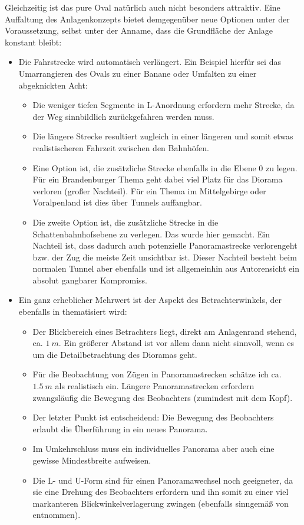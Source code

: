 Gleichzeitig ist das pure Oval nat\"urlich auch nicht besonders attraktiv.
Eine Auffaltung des Anlagenkonzepts bietet demgegen\"uber neue Optionen unter der Voraussetzung, selbst unter der Anname, dass die Grundfl\"ache der Anlage konstant bleibt:
\begin{itemize}
	\item Die Fahrstrecke wird automatisch verl\"angert.
	Ein Beispiel hierf\"ur sei das Umarrangieren des Ovals zu einer Banane oder Umfalten zu einer abgeknickten Acht:
	\begin{itemize}
		\item Die weniger tiefen Segmente in L-Anordnung erfordern mehr Strecke, da der Weg sinnbildlich zur\"uckgefahren werden muss.
		\item Die l\"angere Strecke resultiert zugleich in einer l\"angeren und somit etwas realistischeren Fahrzeit zwischen den Bahnh\"ofen.
		\item Eine Option ist, die zus\"atzliche Strecke ebenfalls in die Ebene 0 zu legen.
		F\"ur ein Brandenburger Thema geht dabei viel Platz f\"ur das Diorama verloren (gro{\ss}er Nachteil).
		F\"ur ein Thema im Mittelgebirge oder Voralpenland ist dies \"uber Tunnels auffangbar.
		\item Die zweite Option ist, die zus\"atzliche Strecke in die Schattenbahnhofsebene zu verlegen.
		Das wurde hier gemacht.
		Ein Nachteil ist, dass dadurch auch potenzielle Panoramastrecke verlorengeht bzw. der Zug die meiste Zeit unsichtbar ist.
		Dieser Nachteil besteht beim normalen Tunnel aber ebenfalls und ist allgemeinhin aus Autorensicht ein absolut gangbarer Kompromiss.
	\end{itemize}
	\item Ein ganz erheblicher Mehrwert ist der Aspekt des Betrachterwinkels, der ebenfalls in \cite{Gee17} thematisiert wird:
	\begin{itemize}
		\item Der Blickbereich eines Betrachters liegt, direkt am Anlagenrand stehend, ca. $1~m$.
		Ein gr\"o{\ss}erer Abstand ist vor allem dann nicht sinnvoll, wenn es um die Detailbetrachtung des Dioramas geht.
		\item F\"ur die Beobachtung von Z\"ugen in Panoramastrecken sch\"atze ich ca. $1.5~m$ als realistisch ein.
		L\"angere Panoramastrecken erfordern zwangsl\"aufig die Bewegung des Beobachters (zumindest mit dem Kopf).
		\item Der letzter Punkt ist entscheidend: Die Bewegung des Beobachters erlaubt die \"Uberf\"uhrung in ein neues Panorama.
		\item Im Umkehrschluss muss ein individuelles Panorama aber auch eine gewisse Mindestbreite aufweisen.
		\item Die L- und U-Form sind f\"ur einen Panoramawechsel noch geeigneter, da sie eine Drehung des Beobachters erfordern und ihn somit zu einer viel markanteren Blickwinkelverlagerung zwingen (ebenfalls sinngem\"a{\ss} von \cite{Gee17} entnommen).
	\end{itemize}
\end{itemize}

